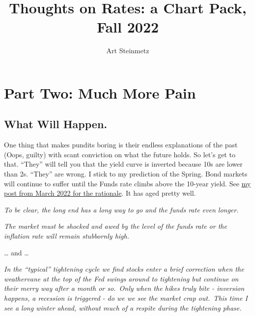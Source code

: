 \documentclass[
  letterpaper,
  DIV=11,
  numbers=noendperiod]{scrartcl}
\title{Thoughts on Rates: a Chart Pack, Fall 2022}
\author{Art Steinmetz}
\date{}
\begin{document}
\maketitle
\ifdefined\Shaded\renewenvironment{Shaded}{\begin{tcolorbox}[borderline west={3pt}{0pt}{shadecolor}, enhanced, boxrule=0pt, interior hidden, breakable, sharp corners, frame hidden]}{\end{tcolorbox}}\fi

\hypertarget{part-two-much-more-pain}{%
\section{Part Two: Much More Pain}\label{part-two-much-more-pain}}

\hypertarget{what-will-happen.}{%
\subsection{What Will Happen.}\label{what-will-happen.}}

One thing that makes pundits boring is their endless explanations of the
past (Oops, guilty) with scant conviction on what the future holds. So
let's get to that. ``They'' will tell you that the yield curve is
inverted because 10s are lower than 2s. ``They'' are wrong. I stick to
my prediction of the Spring. Bond markets will continue to suffer until
the Funds rate climbs above the 10-year yield. See
\href{https://www.linkedin.com/posts/asteinmetz_markets-activity-6914653620307140610-wgYi}{my
post from March 2022 for the rationale}. It has aged pretty well.

\begin{tcolorbox}[enhanced jigsaw, arc=.35mm, toprule=.15mm, breakable, colframe=quarto-callout-note-color-frame, leftrule=.75mm, left=2mm, opacityback=0, bottomrule=.15mm, rightrule=.15mm, colback=white]
\emph{To be clear, the long end has a long way to go and the funds rate
even longer.}~

\emph{The market must be shocked and awed by the level of the funds rate
or the inflation rate will remain stubbornly high.}
\end{tcolorbox}

\ldots{} and \ldots{}

\begin{tcolorbox}[enhanced jigsaw, arc=.35mm, toprule=.15mm, breakable, colframe=quarto-callout-note-color-frame, leftrule=.75mm, left=2mm, opacityback=0, bottomrule=.15mm, rightrule=.15mm, colback=white]
\emph{In the ``typical'' tightening cycle we find stocks enter a brief
correction when the weathervane at the top of the Fed swings around to
tightening but continue on their merry way after a month or so.~Only
when the hikes truly bite - inversion happens, a recession is triggered
- do we we see the market crap out.~This time I see a long winter ahead,
without much of a respite during the tightening phase.}
\end{tcolorbox}
\end{document}
